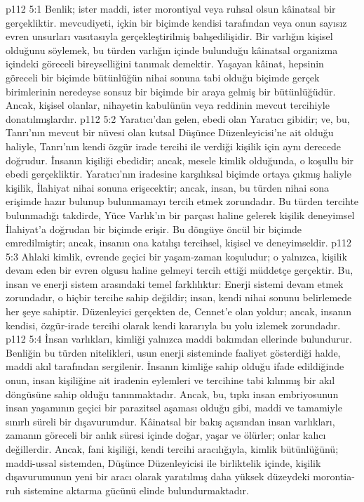 \vs p112 5:1 Benlik; ister maddi, ister morontiyal veya ruhsal olsun kâinatsal bir gerçekliktir.  mevcudiyeti, içkin bir biçimde kendisi tarafından veya onun sayısız evren unsurları vasıtasıyla gerçekleştirilmiş bahşedilişidir. Bir varlığın kişisel olduğunu söylemek, bu türden varlığın içinde bulunduğu kâinatsal organizma içindeki göreceli bireyselliğini tanımak demektir. Yaşayan kâinat, hepsinin göreceli bir biçimde bütünlüğün nihai sonuna tabi olduğu biçimde gerçek birimlerinin neredeyse sonsuz bir biçimde bir araya gelmiş bir bütünlüğüdür. Ancak, kişisel olanlar, nihayetin kabulünün veya reddinin mevcut tercihiyle donatılmışlardır.
\vs p112 5:2 Yaratıcı’dan gelen, ebedi olan Yaratıcı gibidir; ve, bu, Tanrı’nın mevcut bir nüvesi olan kutsal Düşünce Düzenleyicisi’ne ait olduğu haliyle, Tanrı’nın kendi özgür irade tercihi ile verdiği kişilik için aynı derecede doğrudur. İnsanın kişiliği ebedidir; ancak, mesele kimlik olduğunda, o koşullu bir ebedi gerçekliktir. Yaratıcı’nın iradesine karşılıksal biçimde ortaya çıkmış haliyle kişilik, İlahiyat nihai sonuna erişecektir; ancak, insan, bu türden nihai sona erişimde hazır bulunup bulunmamayı tercih etmek zorundadır. Bu türden tercihte bulunmadığı takdirde, Yüce Varlık’ın bir parçası haline gelerek kişilik deneyimsel İlahiyat’a doğrudan bir biçimde erişir. Bu döngüye öncül bir biçimde emredilmiştir; ancak, insanın ona katılışı tercihsel, kişisel ve deneyimseldir.
\vs p112 5:3 Ahlaki kimlik, evrende geçici bir yaşam\hyp{}zaman koşuludur; o yalnızca, kişilik devam eden bir evren olgusu haline gelmeyi tercih ettiği müddetçe gerçektir. Bu, insan ve enerji sistem arasındaki temel farklılıktır: Enerji sistemi devam etmek zorundadır, o hiçbir tercihe sahip değildir; insan, kendi nihai sonunu belirlemede her şeye sahiptir. Düzenleyici gerçekten de, Cennet’e olan yoldur; ancak, insanın kendisi, özgür\hyp{}irade tercihi olarak kendi kararıyla bu yolu izlemek zorundadır.
\vs p112 5:4 İnsan varlıkları, kimliği yalnızca maddi bakımdan ellerinde bulundurur. Benliğin bu türden nitelikleri, usun enerji sisteminde faaliyet gösterdiği halde, maddi akıl tarafından sergilenir. İnsanın kimliğe sahip olduğu ifade edildiğinde onun, insan kişiliğine ait iradenin eylemleri ve tercihine tabi kılınmış bir akıl döngüsüne sahip olduğu tanınmaktadır. Ancak, bu, tıpkı insan embriyosunun insan yaşamının geçici bir parazitsel aşaması olduğu gibi, maddi ve tamamiyle sınırlı süreli bir dışavurumdur. Kâinatsal bir bakış açısından insan varlıkları, zamanın göreceli bir anlık süresi içinde doğar, yaşar ve ölürler; onlar kalıcı değillerdir. Ancak, fani kişiliği, kendi tercihi aracılığıyla, kimlik bütünlüğünü; maddi\hyp{}ussal sistemden, Düşünce Düzenleyicisi ile birliktelik içinde, kişilik dışavurumunun yeni bir aracı olarak yaratılmış daha yüksek düzeydeki morontia\hyp{}ruh sistemine aktarma gücünü elinde bulundurmaktadır.
